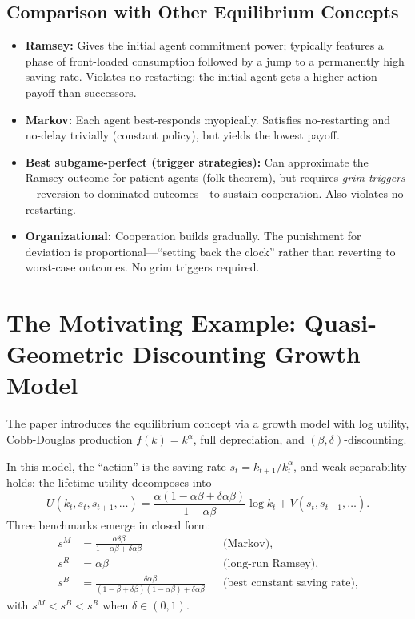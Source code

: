 \documentclass[12pt]{article}
\begin{document}
\subsection{Comparison with Other Equilibrium Concepts}

\begin{itemize}
  \item \textbf{Ramsey:}  Gives the initial agent commitment power; typically
    features a phase of front-loaded consumption followed by a jump to a
    permanently high saving rate.  Violates no-restarting: the initial agent
    gets a higher action payoff than successors.

  \item \textbf{Markov:}  Each agent best-responds myopically.  Satisfies
    no-restarting and no-delay trivially (constant policy), but yields the
    lowest payoff.

  \item \textbf{Best subgame-perfect (trigger strategies):}  Can approximate the
    Ramsey outcome for patient agents (folk theorem), but requires \emph{grim
    triggers}---reversion to dominated outcomes---to sustain cooperation.  Also
    violates no-restarting.

  \item \textbf{Organizational:}  Cooperation builds gradually.  The punishment
    for deviation is proportional---``setting back the clock'' rather than
    reverting to worst-case outcomes.  No grim triggers required.
\end{itemize}


\section{The Motivating Example: Quasi-Geometric Discounting Growth Model}

The paper introduces the equilibrium concept via a growth model with log utility,
Cobb-Douglas production $f(k) = k^\alpha$, full depreciation, and
$(\beta,\delta)$-discounting.

In this model, the ``action'' is the saving rate $s_t = k_{t+1}/k_t^\alpha$, and
weak separability holds:  the lifetime utility decomposes into
\[
  U(k_t, s_t, s_{t+1}, \ldots) = \frac{\alpha(1 - \alpha\beta + \delta\alpha\beta)}{1 - \alpha\beta} \log k_t + V(s_t, s_{t+1}, \ldots).
\]
Three benchmarks emerge in closed form:
\begin{align*}
  s^M &= \frac{\alpha\delta\beta}{1 - \alpha\beta + \delta\alpha\beta}
    && \text{(Markov)}, \\
  s^R &= \alpha\beta
    && \text{(long-run Ramsey)}, \\
  s^B &= \frac{\delta\alpha\beta}{(1-\beta+\delta\beta)(1-\alpha\beta) + \delta\alpha\beta}
    && \text{(best constant saving rate)},
\end{align*}
with $s^M < s^B < s^R$ when $\delta \in (0,1)$.
\end{document}
